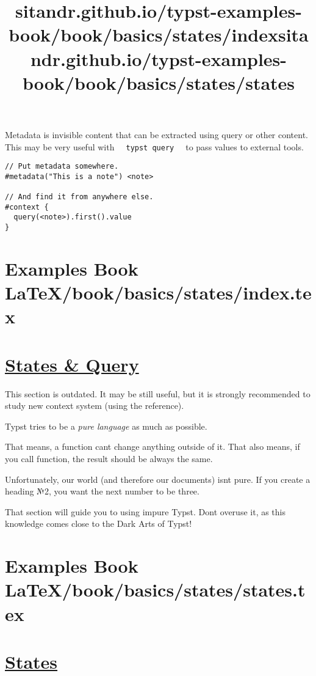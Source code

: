 Metadata is invisible content that can be extracted using query or other
content. This may be very useful with
\texttt{\ }{\texttt{\ typst\ query\ }}\texttt{\ } to pass values to
external tools.

\begin{verbatim}
// Put metadata somewhere.
#metadata("This is a note") <note>

// And find it from anywhere else.
#context {
  query(<note>).first().value
}
\end{verbatim}

\pandocbounded{}


\section{Examples Book LaTeX/book/basics/states/index.tex}
\title{sitandr.github.io/typst-examples-book/book/basics/states/index}

\section{\texorpdfstring{\hyperref[states--query]{States \&
Query}}{States \& Query}}\label{states--query}

This section is outdated. It may be still useful, but it is strongly
recommended to study new context system (using the reference).

Typst tries to be a \emph{pure language} as much as possible.

That means, a function can\textquotesingle t change anything outside of
it. That also means, if you call function, the result should be always
the same.

Unfortunately, our world (and therefore our documents)
isn\textquotesingle t pure. If you create a heading №2, you want the
next number to be three.

That section will guide you to using impure Typst. Don\textquotesingle t
overuse it, as this knowledge comes close to the Dark Arts of Typst!


\section{Examples Book LaTeX/book/basics/states/states.tex}
\title{sitandr.github.io/typst-examples-book/book/basics/states/states}

\section{\texorpdfstring{\hyperref[states]{States}}{States}}\label{states}

